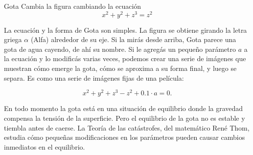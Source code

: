 \begin{surferPage}{Gota}
Cambia la figura cambiando la ecuación\\

\smallskip
\[x^2	+ y^2	+ z^3	= z^2\]

\singlespacing
La ecuación y la forma de Gota son simples. La figura se obtiene girando la letra griega $\alpha$ (Alfa) alrededor de su eje. Si la mirás desde arriba, Gota parece una gota de agua cayendo, de ahí su nombre.
\newline
Si le agregás un pequeño parámetro $a$ a la ecuación y lo modificás varias veces, podemos crear una serie de imágenes que muestran cómo emerge la gota, cómo se aproxima a su forma final, y luego se separa. Es como una serie de imágenes fijas de una película: 

\[x^2	+ y^2	+ z^3	-z^2+0.1\cdot a=0.\]

En todo momento la gota está en una situación de equilibrio donde la gravedad compensa la tensión de la superficie. Pero el equilibrio de la gota no es estable y tiembla antes de caerse. La Teoría de las catástrofes, del matemático Ren\'e Thom, estudia cómo pequeñas modificaciones en los parámetros pueden causar cambios inmediatos en el equilibrio.
\end{surferPage}
